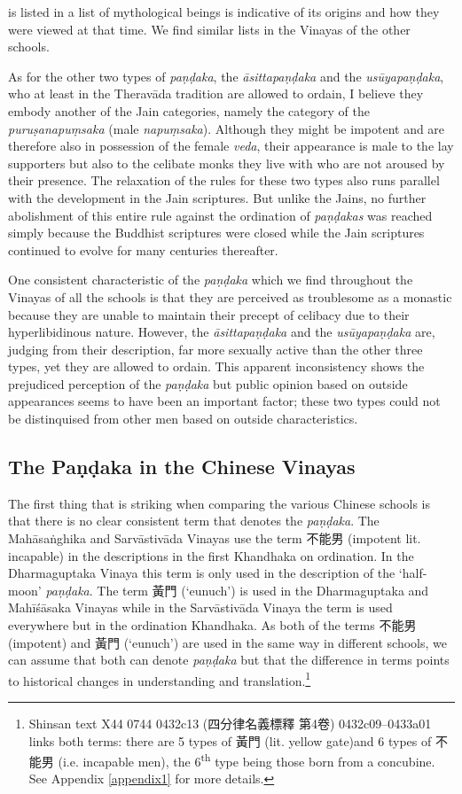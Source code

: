 is listed in a list of mythological beings is indicative of its origins and how they were viewed at that time. We find similar lists in the Vinayas of the other schools.

As for the other two types of {\em paṇḍaka}, the {\em āsittapaṇḍaka} and the {\em usūyapaṇḍaka}, who at least in the Theravāda tradition are allowed to ordain, I believe they embody another of the Jain categories, namely the category of the {\em puruṣanapuṃsaka} (male {\em napuṃsaka}). Although they might be impotent and are therefore also in possession of the female {\em veda}, their appearance is male to the lay supporters but also to the celibate monks they live with who are not aroused by their presence. The relaxation of the rules for these two types also runs parallel with the development in the Jain scriptures. But unlike the Jains, no further abolishment of this entire rule against the ordination of {\em paṇḍakas} was reached simply because the Buddhist scriptures were closed while the Jain scriptures continued to evolve for many centuries thereafter.

One consistent characteristic of the {\em paṇḍaka} which we find throughout the Vinayas of all the schools is that they are perceived as troublesome as a monastic because they are unable to maintain their precept of celibacy due to their hyperlibidinous nature. However, the {\em āsittapaṇḍaka} and the {\em usūyapaṇḍaka} are, judging from their description, far more sexually active than the other three types, yet they are allowed to ordain. This apparent inconsistency shows the prejudiced perception of the {\em paṇḍaka} but public opinion based on outside appearances seems to have been an important factor; these two types could not be distinquised from other men based on outside characteristics. 

\subsection{The Paṇḍaka in the Chinese Vinayas}
The first thing that is striking when comparing the various Chinese schools is that there is no clear consistent term that denotes the {\em paṇḍaka}. The Mahāsaṅghika and Sarvāstivāda Vinayas use the term 不能男 (impotent lit. incapable) in the descriptions in the first Khandhaka on ordination. In the Dharmaguptaka Vinaya this term is only used in the description of the `half-moon' {\em paṇḍaka}. The term 黃門 (`eunuch') is used in the Dharmaguptaka and Mahīśāsaka Vinayas while in the Sarvāstivāda Vinaya the term is used everywhere but in the ordination Khandhaka. As both of the terms 不能男 (impotent) and 黃門 (`eunuch') are used in the same way in different schools, we can assume that both can denote {\em paṇḍaka} but that the difference in terms points to historical changes in understanding and translation.\footnote{Shinsan text X44 0744 0432c13 (四分律名義標釋 第4卷) 0432c09–0433a01 links both terms: there are 5 types of 黃門 (lit. yellow gate)and 6 types of 不能男 (i.e. incapable men), the 6\textsuperscript{th} type being those born from a concubine. See Appendix \ref{appendix1} for more details.}

